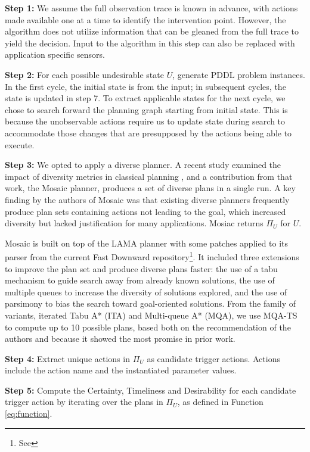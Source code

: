 \textbf{Step 1:} We assume the full observation trace is known in advance, with actions made available one at a time to identify the intervention point. However, the algorithm does not utilize information that can be gleaned from the full trace to yield the decision. Input to the algorithm in this step can also be replaced with application specific sensors.  

\textbf{Step 2:} For each possible undesirable state $U$, generate PDDL problem instances. In the first cycle, the initial state is from the input; in subsequent cycles, the state is updated in step 7. To extract applicable states for the next cycle, we chose to search forward the planning graph starting from initial state. This is because the unobservable actions require us to update state during search to accommodate those changes that are presupposed by the actions being able to execute. 

\textbf{Step 3:}
We opted to apply a diverse planner.  
A recent study examined the impact of diversity metrics in classical planning  \cite{roberts2014}, and a contribution from that work, the Mosaic planner, produces a set of diverse plans in a single run. 
A key finding by the authors of Mosaic was that existing diverse planners frequently produce plan sets containing actions not leading to the goal, which increased diversity but lacked justification for many applications. 
Mosiac returns $\Pi_U$ for $U$. 

Mosaic is built on top of the LAMA planner \cite{richterWestphal10.jair.LAMA}  with some patches applied to its parser from the current Fast Downward repository\footnote{See }. It included three extensions to improve the plan set and produce diverse plans faster: the use of a tabu mechanism to guide search away from already known solutions, the use of multiple queues to increase the diversity of solutions explored, and the use of parsimony to bias the search toward goal-oriented solutions. From the family of variants, iterated Tabu A* (ITA) and Multi-queue A* (MQA), we use MQA-TS to compute up to 10 possible plans, based both on the recommendation of the authors and because it showed the most promise in prior work. 

\textbf{Step 4:} Extract unique actions in $\Pi_U$ as candidate trigger actions. Actions include the action name and the instantiated parameter values.

\textbf{Step 5:} Compute the Certainty, Timeliness and Desirability for each candidate trigger action by iterating over the plans in $\Pi_U$, as defined in Function \ref{eq:function}. 

